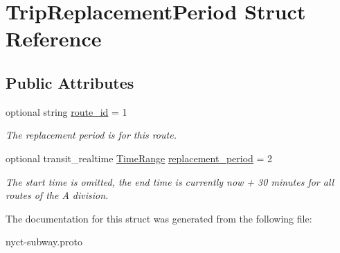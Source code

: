 \hypertarget{structTripReplacementPeriod}{}\section{Trip\+Replacement\+Period Struct Reference}
\label{structTripReplacementPeriod}
\subsection*{Public Attributes}
\begin{DoxyCompactItemize}
\item 
optional string \hyperlink{structTripReplacementPeriod_a85c0677b426b1936276fa2081adaf609}{route\+\_\+id} = 1\hypertarget{structTripReplacementPeriod_a85c0677b426b1936276fa2081adaf609}{}\label{structTripReplacementPeriod_a85c0677b426b1936276fa2081adaf609}

\begin{DoxyCompactList}\small\item\em The replacement period is for this route. \end{DoxyCompactList}\item 
optional transit\+\_\+realtime \hyperlink{structTimeRange}{Time\+Range} \hyperlink{structTripReplacementPeriod_a04d5782305324cbc36a0b986aada5cfb}{replacement\+\_\+period} = 2\hypertarget{structTripReplacementPeriod_a04d5782305324cbc36a0b986aada5cfb}{}\label{structTripReplacementPeriod_a04d5782305324cbc36a0b986aada5cfb}

\begin{DoxyCompactList}\small\item\em The start time is omitted, the end time is currently now + 30 minutes for all routes of the A division. \end{DoxyCompactList}\end{DoxyCompactItemize}


The documentation for this struct was generated from the following file\+:\begin{DoxyCompactItemize}
\item 
nyct-\/subway.\+proto\end{DoxyCompactItemize}
